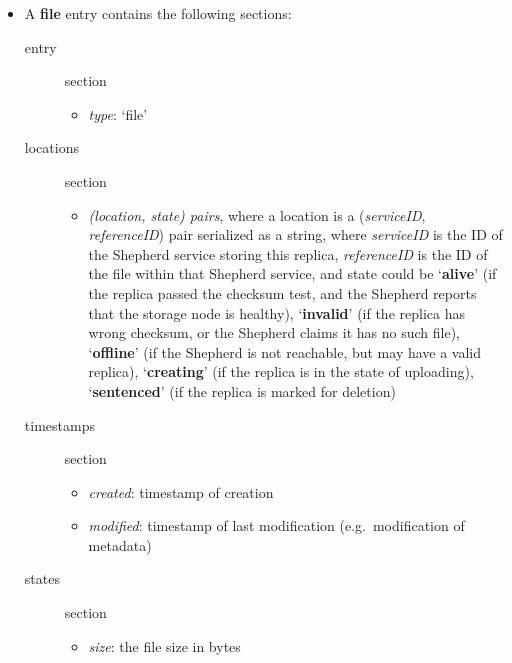 \documentclass{book}
\begin{document}
\begin{itemize}
    \item A \textbf{file} entry contains the following sections: 
    \begin{description}
        \item [entry] section 
        \begin{itemize}
            \item \emph{type}: `file' 
        \end{itemize}
        \item [locations] section 
        \begin{itemize}
            \item \emph{(location, state) pairs}, where a location is a (\emph{serviceID}, \emph{referenceID}) pair serialized as a  string, where \emph{serviceID} is the ID of the Shepherd service storing this replica, \emph{referenceID} is the ID of the file within that Shepherd service, and state could be `\textbf{alive}' (if the replica passed the checksum test, and the Shepherd reports that the storage node is healthy), `\textbf{invalid}' (if the replica has wrong checksum, or the Shepherd claims it has no such file), `\textbf{offline}' (if the Shepherd is not reachable, but may have a valid replica), `\textbf{creating}' (if the replica is in the state of uploading), `\textbf{sentenced}' (if the replica is marked for deletion) 
        \end{itemize}
        \item [timestamps] section 
        \begin{itemize}
            \item \emph{created}: timestamp of creation 
            \item \emph{modified}: timestamp of last modification (e.g.~modification of metadata)
        \end{itemize}
        \item [states] section 
        \begin{itemize}
            \item \emph{size}: the file size in bytes

\end{itemize}
\end{description}
\end{itemize}
\end{document}
